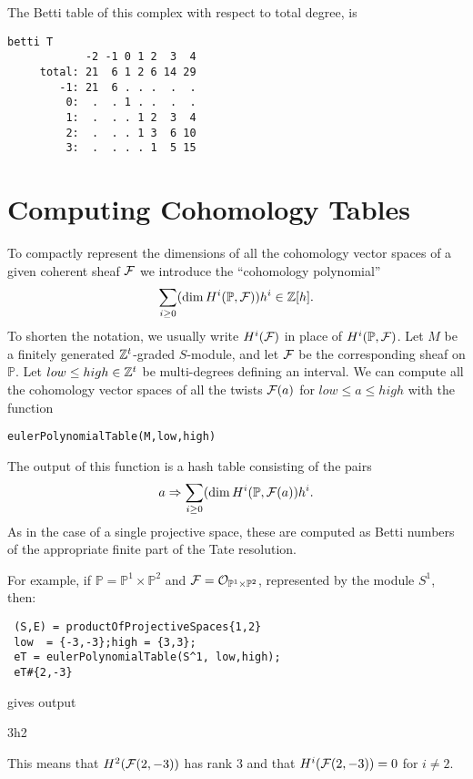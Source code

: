 \documentclass[twoside,12pt, leqno]{amsart}
\def\PP{{\mathbb P}}
\begin{document}
The Betti table of this complex with respect to total degree, is
\goodbreak
{\small \begin{verbatim}
betti T
            -2 -1 0 1 2  3  4
     total: 21  6 1 2 6 14 29
        -1: 21  6 . . .  .  .
         0:  .  . 1 . .  .  .
         1:  .  . . 1 2  3  4
         2:  .  . . 1 3  6 10
         3:  .  . . . 1  5 15
\end{verbatim}}
\noindent

\section{Computing Cohomology Tables}\label{sec:cohom tables}
To compactly represent the dimensions of all the cohomology vector spaces of a given coherent sheaf ${\mathcal F}$ we introduce the ``cohomology polynomial''
$$
\sum_{i\geq 0} (\dim H^i(\PP, \sF))h^i\in \ZZ[h].
$$
To shorten the notation, we usually write $H^i({\mathcal F})$ in place of $H^i(\PP, \sF)$.
Let $M$ be a finitely generated ${\mathbb Z}^t$-graded $S$-module, and let ${\mathcal F}$ be the 
corresponding sheaf on $\PP$. Let
$low\leq high\in {\mathbb Z}^t$ be multi-degrees defining an interval. We can compute
all the cohomology vector spaces of all the twists ${\mathcal F}(a)$ for $low\leq a\leq high$ with the function 
{\small \begin{verbatim}
eulerPolynomialTable(M,low,high)
\end{verbatim}}
The output of this function is a hash table consisting of the pairs
$$ 
a \Rightarrow \sum_{i\geq 0} (\dim H^i(\PP, \sF(a))h^i.
$$
As in the case of a single projective space, these are computed as Betti numbers of the appropriate finite  part of the Tate resolution.

For example,  if $\PP=\PP^1\times \PP^2$ and   $\sF = \sO_{\PP^1\times \PP^2}$, represented by the module
$S^1$, then:
{\small \begin{verbatim}
 (S,E) = productOfProjectiveSpaces{1,2}
 low  = {-3,-3};high = {3,3};
 eT = eulerPolynomialTable(S^1, low,high);
 eT#{2,-3}
\end{verbatim}}
gives output
\begin{verb}
3h2 
\end{verb}
This means that $H^2({\mathcal F}(2,-3))$ has rank $3$ and that $H^i({\mathcal F}(2,-3)) = 0$ for $i\ne 2$.
\end{document}
